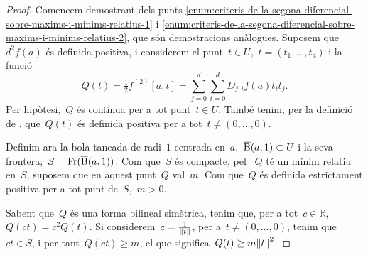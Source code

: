 \documentclass[../../main.tex]{subfiles}
\begin{document}
    \begin{proof}
        Comencem demostrant dels punts \eqref{enum:criteris-de-la-segona-diferencial-sobre-maxims-i-minims-relatius-1} i \eqref{enum:criteris-de-la-segona-diferencial-sobre-maxims-i-minims-relatius-2}, que són demostracions anàlogues.
        Suposem que~\(d^{2}f(a)\) és definida positiva, i considerem el punt~\(t\in U\),~\(t=(t_{1},\dots,t_{d})\) i la funció
        \[
            Q(t)=\tfrac{1}{2}f^{(2)}[a,t]=\sum_{j=0}^{d}\sum_{i=0}^{d}D_{j,i}f(a)t_{i}t_{j}.
        \]
        Per hipòtesi,~\(Q\) és contínua per a tot punt~\(t\in U\).
        També tenim, per la definició de , que~\(Q(t)\) és definida positiva per a tot~\(t\neq(0,\dots,0)\).

        Definim ara la bola tancada de radi~\(1\) centrada en~\(a\),~\(\overline{\operatorname{B}}(a,1)\subset U\) i la seva frontera,~\(S=\operatorname{Fr}(\overline{\operatorname{B}}(a,1))\).
        Com que~\(S\) és compacte, pel  ~\(Q\) té un mínim relatiu en~\(S\), suposem que en aquest punt~\(Q\) val~\(m\).
        Com que~\(Q\) és definida estrictament positiva per a tot punt de~\(S\),~\(m>0\).

        Sabent que~\(Q\) és una forma bilineal simètrica, tenim que, per a tot~\(c\in\mathbb{R}\),~\(Q(ct)=c^{2}Q(t)\).
        Si considerem~\(c=\frac{1}{\norm{t}}\), per a~\(t\neq(0,\dots,0)\), tenim que~\(ct\in S\), i per tant~\(Q(ct)\geq m\), el que significa~\(Q(t)\geq m\norm{t} ^{2}\).


\end{proof}
\end{document}
